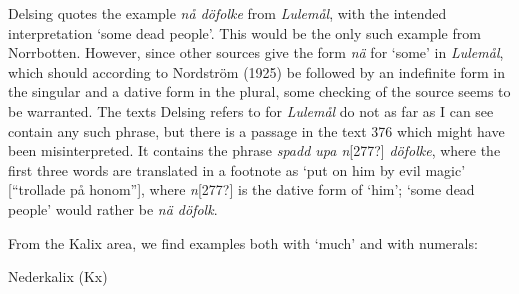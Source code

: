 \begin{styleBodyTextFirst}
Delsing quotes the example \textit{nå döfolke }from \textit{Lulemål}, with the intended interpretation ‘some dead people’. This would be the only such example from Norrbotten. However, since other sources give the form \textit{nä} for ‘some’ in \textit{Lulemål}, which should according to Nordström (1925) be followed by an indefinite form in the singular and a dative form in the plural, some checking of the source seems to be warranted. The texts Delsing refers to for \textit{Lulemål} do not as far as I can see contain any such phrase, but there is a passage in the text 376 which might have been misinterpreted. It contains the phrase \textit{spadd upa n}[277?]\textit{ döfolke}, where the first three words are translated in a footnote as ‘put on him by evil magic’ [“trollade på honom”], where \textit{n}[277?] is the dative form of ‘him’; ‘some dead people’ would rather be \textit{nä döfolk}. 

\end{styleBodyTextFirst}

\begin{styleBodytextC}
From the Kalix area, we find examples both with ‘much’ and with numerals:

\end{styleBodytextC}


\begin{listWWNumileveli}
\item {}

\begin{styleExample}
Nederkalix (Kx) 

\end{styleExample}

\end{listWWNumileveli}

\begin{listWWNumxxxviileveli}
\item {}

\end{listWWNumxxxviileveli}

